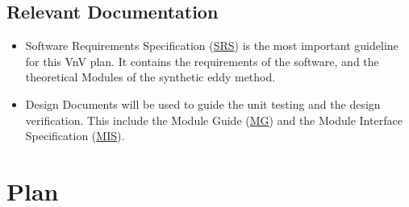 \documentclass[12pt, titlepage]{article}
\begin{document}


\subsection{Relevant Documentation}

\begin{itemize}
  \item Software Requirements Specification (\href{https://github.com/omltcat/turbulent-flow/blob/main/docs/SRS/SRS.pdf}{SRS}) \citet{SRS} is the most important guideline for this VnV plan. It contains the requirements of the software, and the theoretical Modules of the synthetic eddy method. 
  \item Design Documents will be used to guide the unit testing and the design verification. This include the Module Guide (\href{https://github.com/omltcat/turbulent-flow/blob/main/docs/Design/SoftArchitecture/MG.pdf}{MG}) and the Module Interface Specification (\href{https://github.com/omltcat/turbulent-flow/blob/main/docs/Design/SoftDetailedDes/MIS.pdf}{MIS}). 
\end{itemize}



\section{Plan}
\end{document}
